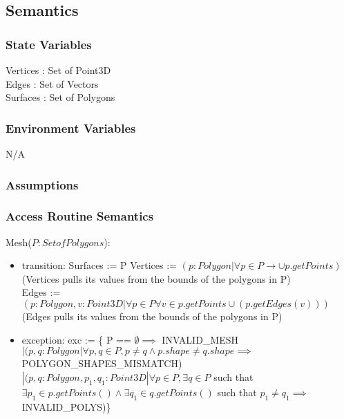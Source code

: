\documentclass[12pt, titlepage]{article}
\begin{document}
\subsection{Semantics}
\subsubsection{State Variables}
Vertices : Set of Point3D\\
Edges : Set of Vectors\\
Surfaces : Set of Polygons\\

\subsubsection{Environment Variables}
N/A

\subsubsection{Assumptions}

\subsubsection{Access Routine Semantics}
\noindent Mesh($P:Set of Polygons$):
\begin{itemize}
	\item transition: Surfaces := P
	Vertices := $(p:Polygon | \forall p \in P \to \cup p.getPoints)$\\
	(Vertices pulls its values from the bounds of the polygons in P)\\
	Edges := $(p:Polygon, v:Point3D | \forall p \in P \forall v \in p.getPoints 
	\cup (p.getEdges(v)))$\\
	(Edges pulls its values from the bounds of the polygons in P)\\
	\item exception: exc := \{ P == $\emptyset \implies$ INVALID\_MESH\\ $| 
	(p,q:Polygon| \forall p, q \in P, p \neq q \land p.shape \neq q.shape 
	\implies$ POLYGON\_SHAPES\_MISMATCH)\\ $| (p,q:Polygon, 
	p_{1},q_{1}:Point3D| 
	\forall p \in P, \exists q \in P$ such that $\exists p_{1} \in 
	p.getPoints() 
	\land \exists q_{1} \in q.getPoints()$ such that $p_{1} \neq q_{1} 
	\implies$ 
	INVALID\_POLYS)\}
	
\end{itemize}
\end{document}
